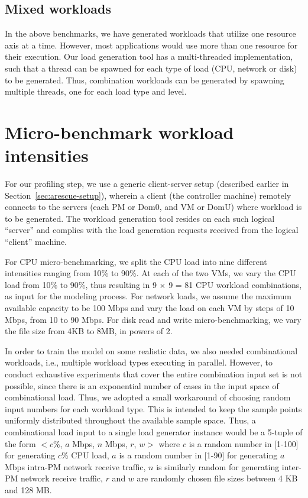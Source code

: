 \subsection{Mixed workloads}
In the above benchmarks, we have generated workloads that utilize one 
resource axis at a time. However, most applications would use more than
one resource for their execution.
Our load generation tool has a multi-threaded implementation, such that a thread 
can be spawned for each type of load (CPU, network or disk) to be generated.
Thus, combination workloads can be generated by spawning multiple threads, one 
for each load type and level. 

\section{Micro-benchmark workload intensities}
For our profiling step, we use a generic client-server setup (described earlier 
in Section~\ref{sec:arescue-setup}), wherein a client (the controller 
machine) remotely connects to the servers (each PM or Dom0, 
and VM or DomU) where workload is to be generated. The workload 
generation tool resides on each such logical ``server'' and complies 
with the load generation requests received from the logical ``client'' machine.

For CPU micro-benchmarking, we split the CPU load into nine different intensities ranging
from 10\% to 90\%. At each of the two VMs, we vary the CPU load from 10\% to 90\%, thus
resulting in 9 $\times$ 9 = 81 CPU workload combinations, as input for the modeling process. For
network loads, we assume the maximum available capacity to be 100 Mbps and vary the load on
each VM by steps of 10 Mbps, from 10 to 90 Mbps. For disk read and write micro-benchmarking,
we vary the file size from 4KB to 8MB, in powers of 2. 

In order to train the model on some realistic data, we also needed combinational workloads,
i.e., multiple workload types executing in parallel. However, to conduct exhaustive experiments
that cover the entire combination input set is not possible, since there is an exponential number
of cases in the input space of combinational load. Thus, we adopted a small workaround of
choosing random input numbers for each workload type. This is intended to keep the sample
points uniformly distributed throughout the available sample space. Thus, a combinational load
input to a single load generator instance would be a 5-tuple of the form $<c$\%, $a$ Mbps, $n$ Mbps,
$r$, $w>$ where $c$ is a random number in [1-100] for generating $c$\% CPU load, $a$ is a random number
in [1-90] for generating $a$ Mbps intra-PM network receive traffic, $n$ is similarly random for generating
inter-PM network receive traffic, $r$ and $w$ are randomly chosen file sizes between 4 KB and 128 MB.

